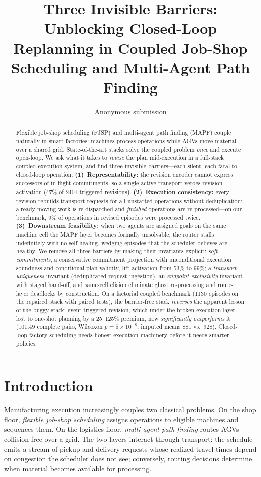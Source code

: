 \documentclass[twocolumn]{article}
\title{Three Invisible Barriers: Unblocking Closed-Loop\\
Replanning in Coupled Job-Shop Scheduling and Multi-Agent Path Finding}
\author{Anonymous submission}
\date{}
\begin{document}
\maketitle

\begin{abstract}
Flexible job-shop scheduling (FJSP) and multi-agent path finding (MAPF)
couple naturally in smart factories: machines process operations while
AGVs move material over a shared grid. State-of-the-art stacks solve the
coupled problem \emph{once} and execute open-loop. We ask what it takes
to \emph{revise} the plan mid-execution in a full-stack coupled execution system, and find three invisible barriers---each silent, each fatal to
closed-loop operation. \textbf{(1)~Representability:} the revision
encoder cannot express successors of in-flight commitments, so a single
active transport vetoes revision activation (47\% of 2401 triggered
revisions). \textbf{(2)~Execution consistency:} every revision rebuilds
transport requests for all unstarted operations without deduplication;
already-moving work is re-dispatched and \emph{finished} operations are
re-processed---on our benchmark, 9\% of operations in revised episodes
were processed twice. \textbf{(3)~Downstream feasibility:} when two agents
are assigned goals on the same machine cell the MAPF layer becomes
formally unsolvable; the router stalls indefinitely with no
self-healing, wedging episodes that the scheduler believes are healthy.
We remove all three barriers by making their invariants explicit:
\emph{soft commitments}, a conservative commitment projection with
unconditional execution soundness and conditional plan validity, lift
activation from 53\% to 99\%; a \emph{transport-uniqueness} invariant
(deduplicated request ingestion), an \emph{endpoint-exclusivity}
invariant with staged hand-off, and same-cell elision eliminate ghost
re-processing and route-layer deadlocks by construction. On a
factorial coupled benchmark (1130 episodes on the repaired stack with
paired tests), the barrier-free stack \emph{reverses} the apparent
lesson of the buggy stack: event-triggered revision, which under the
broken execution layer lost to one-shot planning by a 25--125\%
premium, now \emph{significantly outperforms} it (101:49 complete
pairs, Wilcoxon $p=5\times10^{-8}$; imputed means 881 vs.\ 928). Closed-loop factory scheduling
needs honest execution machinery before it needs smarter policies.
\end{abstract}

\section{Introduction}
Manufacturing execution increasingly couples two classical problems.
On the shop floor, \emph{flexible job-shop scheduling} assigns operations
to eligible machines and sequences them. On the logistics floor,
\emph{multi-agent path finding} routes AGVs collision-free over a grid.
The two layers interact through transport: the schedule emits a stream of
pickup-and-delivery requests whose realized travel times depend on
congestion the scheduler does not see; conversely, routing decisions
determine when material becomes available for processing.
\end{document}
